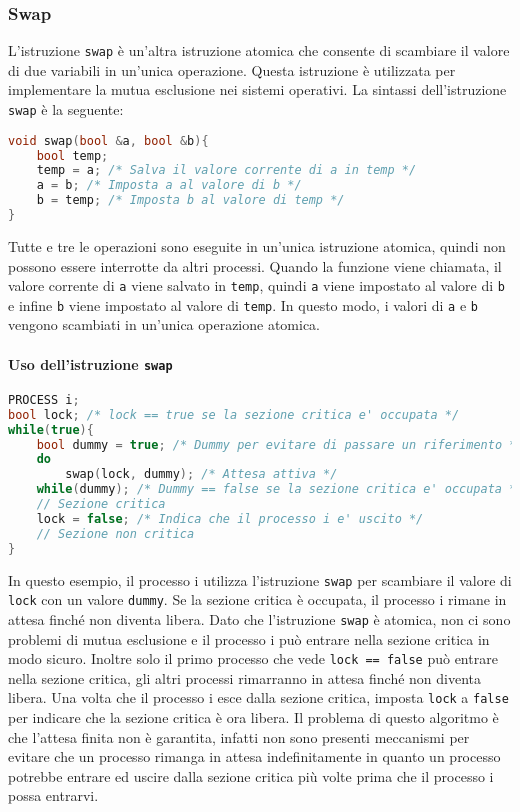         \subsubsection{Swap}
            L'istruzione \texttt{swap} è un'altra istruzione atomica che consente di scambiare il valore di due variabili in un'unica operazione. Questa istruzione è utilizzata per implementare la mutua esclusione nei sistemi operativi. La sintassi dell'istruzione \texttt{swap} è la seguente:
            \begin{lstlisting}[language=C++, morekeywords={mov, eax, add}]
void swap(bool &a, bool &b){
    bool temp;
    temp = a; /* Salva il valore corrente di a in temp */
    a = b; /* Imposta a al valore di b */
    b = temp; /* Imposta b al valore di temp */
}
            \end{lstlisting}
            Tutte e tre le operazioni sono eseguite in un'unica istruzione atomica, quindi non possono essere interrotte da altri processi. Quando la funzione viene chiamata, il valore corrente di \texttt{a} viene salvato in \texttt{temp}, quindi \texttt{a} viene impostato al valore di \texttt{b} e infine \texttt{b} viene impostato al valore di \texttt{temp}. In questo modo, i valori di \texttt{a} e \texttt{b} vengono scambiati in un'unica operazione atomica.
            \paragraph{Uso dell'istruzione \texttt{swap}}
                \begin{lstlisting}[language=C++,basicstyle=\footnotesize]
PROCESS i;
bool lock; /* lock == true se la sezione critica e' occupata */
while(true){
    bool dummy = true; /* Dummy per evitare di passare un riferimento */
    do
        swap(lock, dummy); /* Attesa attiva */
    while(dummy); /* Dummy == false se la sezione critica e' occupata */
    // Sezione critica
    lock = false; /* Indica che il processo i e' uscito */
    // Sezione non critica
}
                \end{lstlisting}
                In questo esempio, il processo i utilizza l'istruzione \texttt{swap} per scambiare il valore di \texttt{lock} con un valore \texttt{dummy}. Se la sezione critica è occupata, il processo i rimane in attesa finché non diventa libera. Dato che l'istruzione \texttt{swap} è atomica, non ci sono problemi di mutua esclusione e il processo i può entrare nella sezione critica in modo sicuro. Inoltre solo il primo processo che vede \texttt{lock == false} può entrare nella sezione critica, gli altri processi rimarranno in attesa finché non diventa libera. Una volta che il processo i esce dalla sezione critica, imposta \texttt{lock} a \texttt{false} per indicare che la sezione critica è ora libera. Il problema di questo algoritmo è che l'attesa finita non è garantita, infatti non sono presenti meccanismi per evitare che un processo rimanga in attesa indefinitamente in quanto un processo potrebbe entrare ed uscire dalla sezione critica più volte prima che il processo i possa entrarvi.
